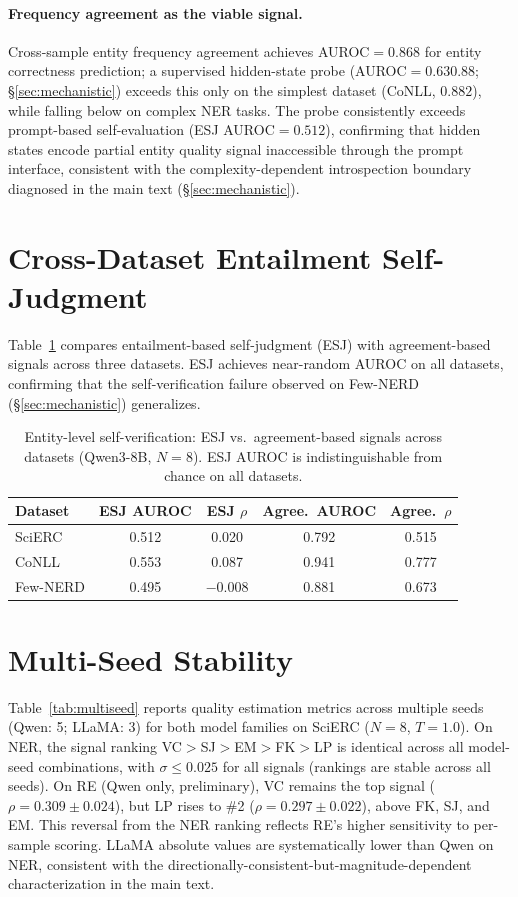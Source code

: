 \paragraph{Frequency agreement as the viable signal.}
Cross-sample entity frequency agreement achieves AUROC${=}0.868$ for entity correctness prediction; a supervised hidden-state probe (AUROC${=}0.63$\textendash$0.88$; \S\ref{sec:mechanistic}) exceeds this only on the simplest dataset (CoNLL, $0.882$), while falling below on complex NER tasks.
The probe consistently exceeds prompt-based self-evaluation (ESJ AUROC${=}0.512$), confirming that hidden states encode partial entity quality signal inaccessible through the prompt interface, consistent with the complexity-dependent introspection boundary diagnosed in the main text (\S\ref{sec:mechanistic}).

\section{Cross-Dataset Entailment Self-Judgment}\label{app:esj}

Table~\ref{tab:esj_cross} compares entailment-based self-judgment (ESJ) with agreement-based signals across three datasets.
ESJ achieves near-random AUROC on all datasets, confirming that the self-verification failure observed on Few-NERD (\S\ref{sec:mechanistic}) generalizes.

\begin{table}[h]
\small
\centering
\caption{Entity-level self-verification: ESJ vs.\ agreement-based signals across datasets (Qwen3-8B, $N{=}8$). ESJ AUROC is indistinguishable from chance on all datasets.}
\label{tab:esj_cross}
\begin{tabular}{lcccc}
\toprule
Dataset & ESJ AUROC & ESJ $\rho$ & Agree.\ AUROC & Agree.\ $\rho$ \\
\midrule
SciERC  & 0.512 & 0.020 & 0.792 & 0.515 \\
CoNLL   & 0.553 & 0.087 & 0.941 & 0.777 \\
Few-NERD & 0.495 & $-$0.008 & 0.881 & 0.673 \\
\bottomrule
\end{tabular}
\end{table}

\section{Multi-Seed Stability}\label{app:multiseed}

Table~\ref{tab:multiseed} reports quality estimation metrics across multiple seeds (Qwen: 5; LLaMA: 3) for both model families on SciERC ($N{=}8$, $T{=}1.0$).
On NER, the signal ranking VC${>}$SJ${>}$EM${>}$FK${>}$LP is identical across all model-seed combinations, with $\sigma{\leq}0.025$ for all signals (rankings are stable across all seeds).
On RE (Qwen only, preliminary), VC remains the top signal ($\rho{=}0.309{\pm}0.024$), but LP rises to \#2 ($\rho{=}0.297{\pm}0.022$), above FK, SJ, and EM. This reversal from the NER ranking reflects RE's higher sensitivity to per-sample scoring.
LLaMA absolute values are systematically lower than Qwen on NER, consistent with the directionally-consistent-but-magnitude-dependent characterization in the main text.

